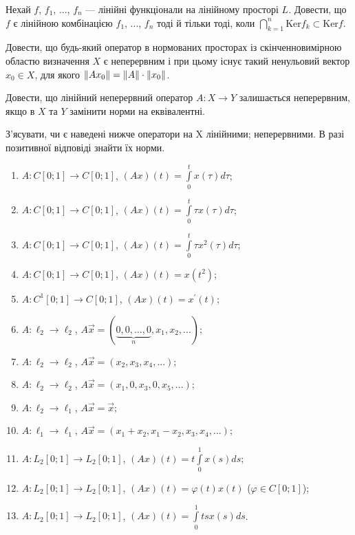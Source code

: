 \begin{exercise}
    Нехай $f$, $f_1$, ..., $f_n$ --- лінійні функціонали на лінійному просторі $L$. 
    Довести, що $f$ є лінійною комбінацією $f_1$, ..., $f_n$ тоді й тільки тоді, 
    коли $\bigcap\limits_{k=1}^n \mathrm{Ker} f_k \subset \mathrm{Ker} f$.
\end{exercise}

\begin{exercise}
    Довести, що будь-який оператор в нормованих просторах із скінченновимірною областю 
    визначення $X$ є неперервним і при цьому існує такий ненульовий вектор $x_0 \in X$, 
    для якого $\left\lVert Ax_0\right\rVert = \left\lVert A\right\rVert\cdot\left\lVert x_0\right\rVert$.
\end{exercise}

\begin{exercise}
    Довести, що лінійний неперервний оператор $A: X \rightarrow Y$ залишається неперервним, 
    якщо в $X$ та $Y$ замінити норми на еквівалентні.
\end{exercise}

\begin{exercise}
    З'ясувати, чи є наведені нижче оператори на X лінійними; 
    неперервними. В разі позитивної відповіді знайти їх норми.
    \begin{enumerate}[label=\ukr*)]
        \item $A: C[0; 1] \rightarrow C[0; 1]$, $(Ax)(t) = \int\limits_0^t x(\tau) d\tau$;
        \item $A: C[0; 1] \rightarrow C[0; 1]$, $(Ax)(t) = \int\limits_0^t \tau x(\tau) d\tau$;
        \item $A: C[0; 1] \rightarrow C[0; 1]$, $(Ax)(t) = \int\limits_0^t \tau x^2(\tau) d\tau$;
        \item $A: C[0; 1] \rightarrow C[0; 1]$, $(Ax)(t) = x(t^2)$;
        \item $A: C^1[0; 1] \rightarrow C[0; 1]$, $(Ax)(t) = x^\prime (t)$; 
        \item $A: \ell_2 \rightarrow \ell_2$, $A\vec{x} = (\underbrace{0,0,...,0}_n,
        x_1,x_2,...)$;
        \item $A: \ell_2 \rightarrow \ell_2$, $A\vec{x} = (x_2,x_3,x_4,...)$;
        \item $A: \ell_2 \rightarrow \ell_2$, $A\vec{x} = (x_1,0,x_3,0,x_5,...)$;
        \item $A: \ell_2 \rightarrow \ell_1$, $A\vec{x} = \vec{x}$;
        \item $A: \ell_1 \rightarrow \ell_1$, $A\vec{x} = (x_1+x_2, x_1-x_2, x_3, x_4, ...)$;
        \item $A: L_2[0; 1] \rightarrow L_2[0; 1]$, $(Ax)(t) = t \int\limits_0^1 x(s)ds$;
        \item $A: L_2[0; 1] \rightarrow L_2[0; 1]$, $(Ax)(t) = \varphi(t)x(t)$ 
        ($\varphi \in C[0;1]$);
        \item $A: L_2[0; 1] \rightarrow L_2[0; 1]$, $(Ax)(t) = \int\limits_0^1 tsx(s)ds$.
    \end{enumerate}
\end{exercise}